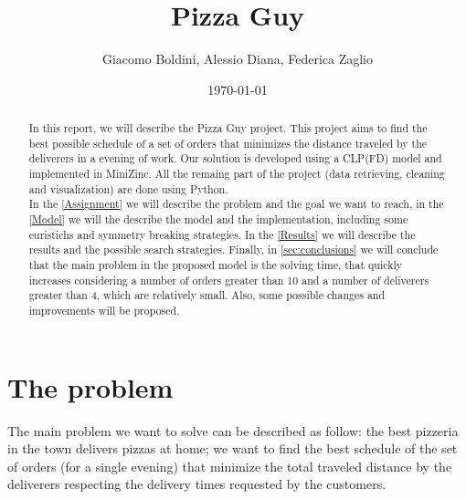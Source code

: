 \documentclass[10pt]{article}
\title{Pizza Guy}
\date{\today}
\author{Giacomo Boldini, Alessio Diana, Federica Zaglio}
\begin{document}
	\maketitle

	\begin{abstract}

		In this report, we will describe the Pizza Guy project. This project 
		aims to find the best possible schedule of a set of orders that
		minimizes the distance traveled by the deliverers in a evening of 
		work. Our solution is developed using a CLP(FD) model and implemented 
		in MiniZinc. All the remaing part of the project (data retrieving, cleaning
		and visualization) are done using Python.\\	
		In the \cref{Assignment} we will describe the problem and the goal
		we want to reach, in the \cref{Model} we will the describe the 
		model and the implementation, including some euristichs and symmetry breaking
		strategies. In the \cref{Results} we will describe the results and
		the possible search strategies. Finally, in \cref{sec:conclusions} we will 
		conclude that the main problem in the proposed model is the solving time,
		that quickly increases considering a number of orders greater than 10
		and a number of deliverers greater than 4, which are relatively small. 
		Also, some possible changes and improvements 
		will be proposed.
		
	\end{abstract}

	{
	\footnotesize
	\tableofcontents
	}

	\pagebreak

	\section{The problem}
	\label{Assignment}
	The main problem we want to solve can be described as follow: the best pizzeria in the 
	town delivers pizzas at home; we want to find the best schedule of the set of orders 
	(for a single evening) that minimize the total traveled distance by the deliverers 
	respecting the delivery times requested by the customers.
	
\end{document}
